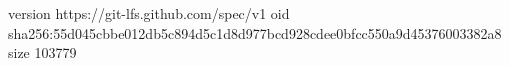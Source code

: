 version https://git-lfs.github.com/spec/v1
oid sha256:55d045cbbe012db5c894d5c1d8d977bcd928cdee0bfcc550a9d45376003382a8
size 103779
